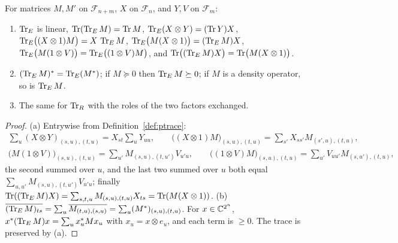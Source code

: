 \begin{lemma}\label{lem:ptrace}
For matrices $M,M'$ on $\mathcal F_{n+m}$, $X$ on $\mathcal F_n$, and $Y,V$ on $\mathcal F_m$:
\begin{enumerate}
\item[(a)] $\operatorname{Tr}_{E}$ is linear, $\operatorname{Tr}(\operatorname{Tr}_{E}M)=\operatorname{Tr} M$, $\operatorname{Tr}_{E}(X\otimes Y)=(\operatorname{Tr} Y)X$,
$\operatorname{Tr}_{E}\bigl((X\otimes1)M\bigr)=X\,\operatorname{Tr}_{E}M$, $\operatorname{Tr}_{E}\bigl(M(X\otimes1)\bigr)=(\operatorname{Tr}_{E}M)X$,
$\operatorname{Tr}_{E}\bigl(M(1\otimes V)\bigr)=\operatorname{Tr}_{E}\bigl((1\otimes V)M\bigr)$, and
$\operatorname{Tr}\bigl((\operatorname{Tr}_{E}M)X\bigr)=\operatorname{Tr}\bigl(M(X\otimes1)\bigr)$.
\item[(b)] $(\operatorname{Tr}_{E}M)^*=\operatorname{Tr}_{E}(M^*)$; if $M\succeq0$ then $\operatorname{Tr}_{E}M\succeq0$; if $M$ is a density
operator, so is $\operatorname{Tr}_{E}M$.
\item[(c)] The same for $\operatorname{Tr}_{R}$ with the roles of the two factors exchanged.
\end{enumerate}
\end{lemma}
\begin{proof}
(a) Entrywise from Definition~\ref{def:ptrace}:
\begin{gather*}
 \textstyle\sum_u(X\otimes Y)_{(s,u),(t,u)}=X_{st}\sum_uY_{uu},\qquad
 \bigl((X\otimes1)M\bigr)_{(s,u),(t,u)}=\sum_{s'}X_{ss'}M_{(s',u),(t,u)},\\
 \textstyle\bigl(M(1\otimes V)\bigr)_{(s,u),(t,u)}=\sum_{u'}M_{(s,u),(t,u')}V_{u'u},\qquad
 \bigl((1\otimes V)M\bigr)_{(s,u),(t,u)}=\sum_{u'}V_{uu'}M_{(s,u'),(t,u)},
\end{gather*}
the second summed over $u$, and the last two summed over $u$ both equal
$\sum_{u,u'}M_{(s,u),(t,u')}V_{u'u}$; finally
$\operatorname{Tr}((\operatorname{Tr}_{E}M)X)=\sum_{s,t,u}M_{(s,u),(t,u)}X_{ts}=\operatorname{Tr}(M(X\otimes1))$.
(b) $\overline{(\operatorname{Tr}_{E}M)_{ts}}=\sum_u\overline{M_{(t,u),(s,u)}}=\sum_u(M^*)_{(s,u),(t,u)}$. For
$x\in\mathbb C^{2^n}$, $x^*(\operatorname{Tr}_{E}M)x=\sum_ux_u^*Mx_u$ with $x_u=x\otimes e_u$, and each term is $\geq0$.
The trace is preserved by (a).
\end{proof}

